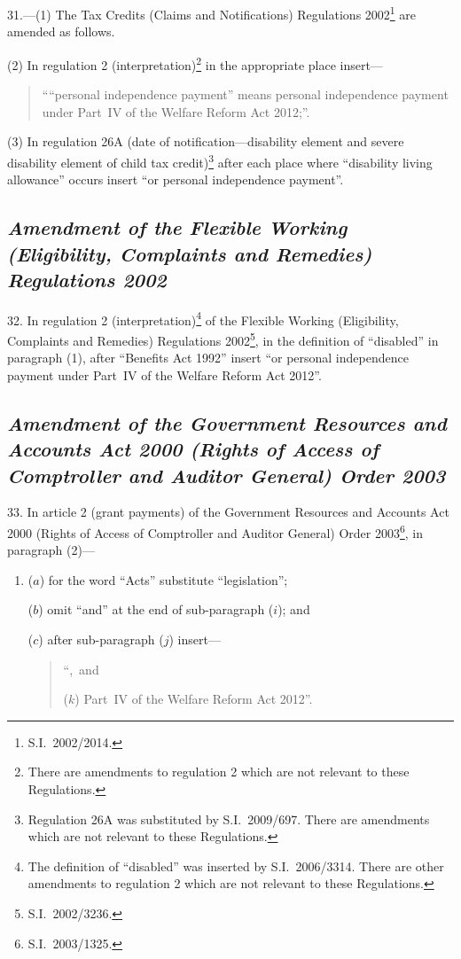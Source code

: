 \documentclass[12pt,a4paper]{article}
\begin{document}
31.—(1) The Tax Credits (Claims and Notifications) Regulations 2002\footnote{S.I.~2002/2014.} are amended as follows.

(2) In regulation 2 (interpretation)\footnote{There are amendments to regulation 2 which are not relevant to these Regulations.} in the appropriate place insert—
\begin{quotation}
““personal independence payment” means personal independence payment under Part~IV of the Welfare Reform Act 2012;”.
\end{quotation}

(3) In regulation 26A (date of notification---disability element and severe disability element of child tax credit)\footnote{Regulation 26A was substituted by S.I.~2009/697. There are amendments which are not relevant to these Regulations.} after each place where “disability living allowance” occurs insert “or personal independence payment”.

\subsection*{\itshape Amendment of the Flexible Working (Eligibility, Complaints and Remedies) Regulations 2002}

32.  In regulation 2 (interpretation)\footnote{The definition of “disabled” was inserted by S.I.~2006/3314. There are other amendments to regulation 2 which are not relevant to these Regulations.} of the Flexible Working (Eligibility, Complaints and Remedies) Regulations 2002\footnote{S.I.~2002/3236.}, in the definition of “disabled” in paragraph (1), after “Benefits Act 1992” insert “or personal independence payment under Part~IV of the Welfare Reform Act 2012”.

\subsection*{\itshape\sloppy Amendment of the Government Resources and Accounts Act 2000 (Rights of Access of Comptroller and Auditor General) Order 2003}

33.  In article 2 (grant payments) of the Government Resources and Accounts Act 2000 (Rights of Access of Comptroller and Auditor General) Order 2003\footnote{S.I.~2003/1325.}, in paragraph (2)—
\begin{enumerate}\item[]
($a$) for the word “Acts” substitute “legislation”;

($b$) omit “and” at the end of sub-paragraph ($i$); and

($c$) after sub-paragraph ($j$)  insert—
\begin{quotation}
“,~and

($k$) Part~IV of the Welfare Reform Act 2012”.
\end{quotation}
\end{enumerate}
\end{document}

